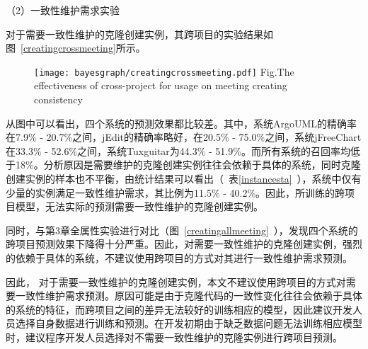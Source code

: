 （2）一致性维护需求实验

对于需要一致性维护的克隆创建实例，其跨项目的实验结果如图~\ref{creatingcrossmeeting}所示。

\begin{figure}[h]
\centering
\texttt{[image: bayesgraph/creatingcrossmeeting.pdf]}
{Fig.$\!$}{The effectiveness of cross-project for usage on meeting creating consistency}
\vspace{-1em}
\end{figure}

从图中可以看出，四个系统的预测效果都比较差。其中，系统ArgoUML的精确率在7.9\% - 20.7\%之间，jEdit的精确率略好，在20.5\% - 75.0\%之间，系统jFreeChart在33.3\% - 52.6\%之间，系统Tuxguitar为44.3\% - 51.9\%。而所有系统的召回率均低于18\%。分析原因是需要维护的克隆创建实例往往会依赖于具体的系统，同时克隆创建实例的样本也不平衡，由统计结果可以看出（~表\ref{instancesta}~），系统中仅有少量的实例满足一致性维护需求，其比例为11.5\% - 40.2\%。因此，所训练的跨项目模型，无法实际的预测需要一致性维护的克隆创建实例。

同时，与第3章全属性实验进行对比（图~\ref{creatingallmeeting}~），发现四个系统的跨项目预测效果下降得十分严重。因此，对需要一致性维护的克隆创建实例，强烈的依赖于具体的系统，不建议使用跨项目的方式对其进行一致性维护需求预测。

因此， 对于需要一致性维护的克隆创建实例，本文不建议使用跨项目的方式对需要一致性维护需求预测。原因可能是由于克隆代码的一致性变化往往会依赖于具体的系统的特征，而跨项目之间的差异无法较好的训练相应的模型，因此建议开发人员选择自身数据进行训练和预测。在开发初期由于缺乏数据问题无法训练相应模型时，建议程序开发人员选择对不需要一致性维护的克隆实例进行跨项目预测。

